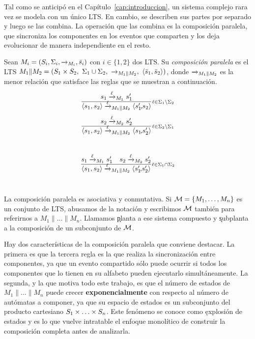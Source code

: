 \medskip

Tal como se anticipó en el Capítulo~\ref{cap:introduccion}, un sistema complejo rara vez se
modela con un único LTS. En cambio, se describen sus partes por separado y luego se las
combina. La
operación que las combina es la composición paralela, que sincroniza los componentes en los
eventos que comparten y los deja evolucionar de manera independiente en el resto.

\begin{definition}
\label{def:composicion}
Sean $M_i = (S_i, \Sigma_i, \pijl{}_{M_i}, \init{s}_i)$ con $i \in \{1,2\}$ dos LTS. Su
\textit{composición paralela} es el LTS
$M_1 \| M_2 = (S_1 \x S_2,\ \Sigma_1 \cup \Sigma_2,\ \pijl{}_{M_1 \| M_2},\
\<\init{s}_1, \init{s}_2\>)$, donde $\pijl{}_{M_1 \| M_2}$ es la menor relación que satisface
las reglas que se muestran a continuación.
\end{definition}

\begin{normalsize}
\centering
\vspace{-10pt}
\begin{minipage}{0.49\linewidth}
\[
\frac{s_1 \pijl{\l}_{M_1} s_1'}{\<s_1,s_2\> \pijl{\l}_{M_1 \| M_2} \<s_1'\!,\!s_2\>}
{{\scriptstyle \l \in \Sigma_1 {\setminus} \Sigma_2}}
\]
\end{minipage}%
\begin{minipage}{0.49\linewidth}
\[
\frac{s_2 \pijl{\l}_{M_2} s_2'}{\<s_1,s_2\> \pijl{\l}_{M_1 \| M_2} \<s_1\!,\!s_2'\>}
{{\scriptstyle \l \in \Sigma_2 {\setminus} \Sigma_1}}
\]
\end{minipage} \\[8pt]
\[
\frac{s_1 \pijl{\l}_{M_1} s_1' \quad s_2 \pijl{\l}_{M_2} s_2'}
{\<s_1,s_2\> \pijl{\l}_{M_1 \| M_2} \<s_1'\!,\!s_2'\>}
{{\scriptstyle \l \in \Sigma_1 {\cap} \Sigma_2}}
\]
\\[8pt]
\end{normalsize}

La composición paralela es asociativa y conmutativa. Si $\mathcal{M} = \{M_1, \ldots, M_n\}$ es un
conjunto de LTS, abusamos de la notación y escribimos $\mathcal{M}$ también para referirnos a
$M_1 \| \ldots \| M_n$. Llamamos \k{planta} a ese sistema compuesto y \k{subplanta} a la
composición de un subconjunto de $\mathcal{M}$.

Hay dos características de la composición paralela que conviene destacar. La primera es que la
tercera regla es la que realiza la sincronización entre componentes, ya que un evento
compartido sólo puede ocurrir si todos los componentes que lo tienen en su alfabeto pueden
ejecutarlo simultáneamente. La segunda, y la que motiva todo este trabajo, es que el número de estados de
$M_1 \| \ldots \| M_n$ puede crecer \textbf{exponencialmente} con respecto al número de
autómatas a componer, ya que su espacio de estados es un subconjunto del producto cartesiano
$S_1 \times \ldots \times S_n$. Este fenómeno se conoce como \k{explosión de estados} y es lo que vuelve
intratable el enfoque monolítico de construir la composición completa antes de analizarla.

